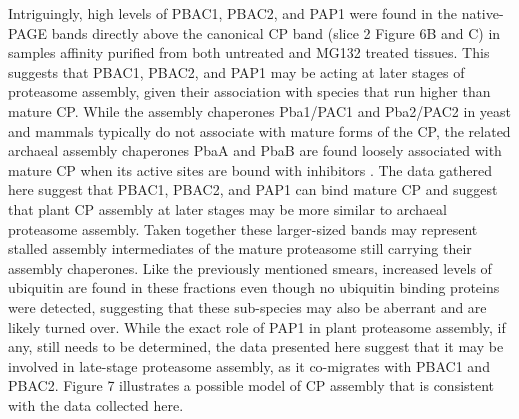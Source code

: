Intriguingly, high levels of PBAC1, PBAC2, and PAP1 were found in the native-PAGE bands directly above the canonical CP band (slice 2 Figure 6B and C) in samples affinity purified from both untreated and MG132 treated tissues. This suggests that PBAC1, PBAC2, and PAP1 may be acting at later stages of proteasome assembly, given their association with species that run higher than mature CP. While the assembly chaperones Pba1/PAC1 and Pba2/PAC2 in yeast and mammals typically do not associate with mature forms of the CP, the related archaeal assembly chaperones PbaA and PbaB are found loosely associated with mature CP when its active sites are bound with inhibitors \citep{kusmierczyk11}. The data gathered here suggest that PBAC1, PBAC2, and PAP1 can bind mature CP and suggest that plant CP assembly at later stages may be more similar to archaeal proteasome assembly. Taken together these larger-sized bands may represent stalled assembly intermediates of the mature proteasome still carrying their assembly chaperones. Like the previously mentioned smears, increased levels of ubiquitin are found in these fractions even though no ubiquitin binding proteins were detected, suggesting that these sub-species may also be aberrant and are likely turned over. While the exact role of PAP1 in plant proteasome assembly, if any, still needs to be determined, the data presented here suggest that it may be involved in late-stage proteasome assembly, as it co-migrates with PBAC1 and PBAC2. Figure 7 illustrates a possible model of CP assembly that is consistent with the data collected here.

